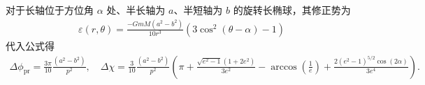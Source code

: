 \begin{exbox}
	对于长轴位于方位角 \(\alpha\) 处、半长轴为 \(a\)、半短轴为 \(b\) 的旋转长椭球，其修正势为
	\begin{align*}
		\varepsilon (r, \theta) = \frac{-GmM (a^2 - b^2)}{10 r^3} \left(3 \cos^2 (\theta - \alpha) - 1\right)
	\end{align*}
	代入公式得
	\begin{align*}
		\Delta\phi_{\text{pr}} = \frac{3 \pi}{10} \frac{(a^2 - b^2)}{p^2},\quad\Delta\chi =
		\frac{3}{10} \frac{(a^2 - b^2)}{p^2} \left(
		\pi + \frac{\sqrt{e^2 - 1} (1 + 2 e^2)}{3 e^2}
		- \arccos \left(\frac{1}{e} \right)
		+ \frac{2 (e^2 - 1)^{5/2} \cos (2 \alpha)}{3 e^4}
		\right).
	\end{align*}
\end{exbox}
